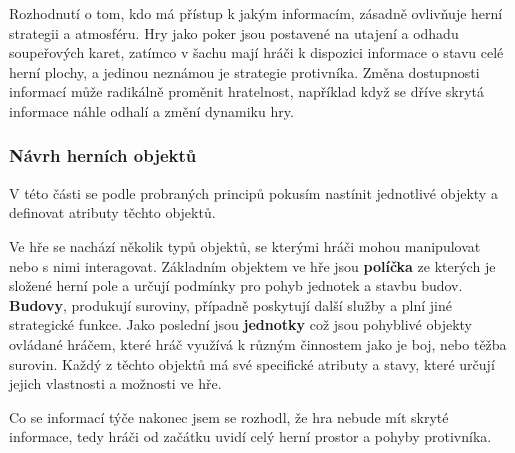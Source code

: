Rozhodnutí o tom, kdo má přístup k jakým informacím, zásadně ovlivňuje herní strategii a atmosféru. Hry jako poker jsou postavené na utajení a odhadu soupeřových karet, zatímco v šachu mají hráči k dispozici informace o stavu celé herní plochy, a jedinou neznámou je strategie protivníka. Změna dostupnosti informací může radikálně proměnit hratelnost, například když se dříve skrytá informace náhle odhalí a změní dynamiku hry.

\subsubsection{Návrh herních objektů}

V této části se podle probraných principů pokusím nastínit jednotlivé objekty a definovat atributy těchto objektů.

Ve hře se nachází několik typů objektů, se kterými hráči mohou manipulovat nebo s nimi interagovat. Základním objektem ve hře jsou \textbf{políčka} ze kterých je složené herní pole a určují podmínky pro pohyb jednotek a stavbu budov. \textbf{Budovy}, produkují suroviny, případně poskytují další služby a plní jiné strategické funkce. Jako poslední jsou \textbf{jednotky} což jsou pohyblivé objekty ovládané hráčem, které hráč využívá k různým činnostem jako je boj, nebo těžba surovin. Každý z těchto objektů má své specifické atributy a stavy, které určují jejich vlastnosti a možnosti ve hře.

Co se informací týče nakonec jsem se rozhodl, že hra nebude mít skryté informace, tedy hráči od začátku uvidí celý herní prostor a pohyby protivníka.


